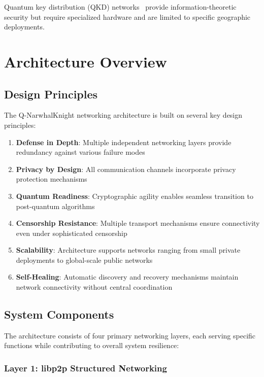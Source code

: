 \documentclass[11pt,a4paper]{article}
\theoremstyle{definition}
\theoremstyle{remark}
\begin{document}
Quantum key distribution (QKD) networks~\cite{qkd-networks} provide information-theoretic security but require specialized hardware and are limited to specific geographic deployments.

\section{Architecture Overview}

\subsection{Design Principles}

The Q-NarwhalKnight networking architecture is built on several key design principles:

\begin{enumerate}
    \item \textbf{Defense in Depth}: Multiple independent networking layers provide redundancy against various failure modes
    \item \textbf{Privacy by Design}: All communication channels incorporate privacy protection mechanisms
    \item \textbf{Quantum Readiness}: Cryptographic agility enables seamless transition to post-quantum algorithms
    \item \textbf{Censorship Resistance}: Multiple transport mechanisms ensure connectivity even under sophisticated censorship
    \item \textbf{Scalability}: Architecture supports networks ranging from small private deployments to global-scale public networks
    \item \textbf{Self-Healing}: Automatic discovery and recovery mechanisms maintain network connectivity without central coordination
\end{enumerate}

\subsection{System Components}

The architecture consists of four primary networking layers, each serving specific functions while contributing to overall system resilience:

\subsubsection{Layer 1: libp2p Structured Networking}
\end{document}
